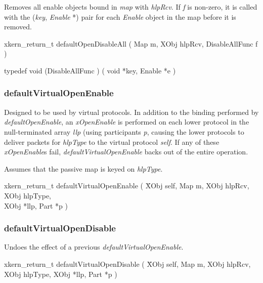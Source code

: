 Removes all enable objects bound in {\em map} with {\em hlpRcv}.
If {\em f} is non-zero, it is called with the ({\em key}, {\em
Enable} *) pair for each {\em Enable} object in the map before it is removed.


\medskip

{\sem xkern\_return\_t} {\bold defaultOpenDisableAll} 
( 
{\sem Map} {\caps m}, 
{\sem XObj} {\caps hlpRcv}, 
{\sem DisableAllFunc} {\caps f}
)

\medskip

{\sem typedef void} ({\bold *DisableAllFunc} )
(
{\sem void} *{\caps key}, 
{\sem Enable} *{\caps e}
)


\subsubsection{defaultVirtualOpenEnable}

Designed to be used by virtual protocols.  In addition to the binding
performed by {\em defaultOpenEnable}, an {\em xOpenEnable} is
performed on each lower protocol in the null-terminated array 
{\em llp} (using participants {\em p}, 
causing the lower protocols to deliver packets for 
{\em hlpType} to the virtual protocol {\em self}.  If any of these
{\em xOpenEnable}s fail, {\em defaultVirtualOpenEnable} backs out of
the entire operation.

Assumes that the passive map is keyed on {\em hlpType}.

\medskip

\begin{tabbing}

\indent
{\sem xkern\_return\_t} {\bold defaultVirtualOpenEnable} 
( \= 
{\sem XObj} {\caps self}, 
{\sem Map} {\caps m}, 
{\sem XObj} {\caps hlpRcv}, 
{\sem XObj} {\caps hlpType}, \\
\> {\sem XObj} *{\caps llp}, 
{\sem Part} *{\caps p}
)

\end{tabbing}

\subsubsection{defaultVirtualOpenDisable}

Undoes the effect of a previous {\em defaultVirtualOpenEnable}.

\medskip

\begin{tabbing}

\indent
{\sem xkern\_return\_t} {\bold defaultVirtualOpenDisable} 
( \=
{\sem XObj} {\caps self}, 
{\sem Map} {\caps m}, 
{\sem XObj} {\caps hlpRcv}, \\
\> {\sem XObj} {\caps hlpType}, 
{\sem XObj} *{\caps llp}, 
{\sem Part} *{\caps p}
)

\end{tabbing}



